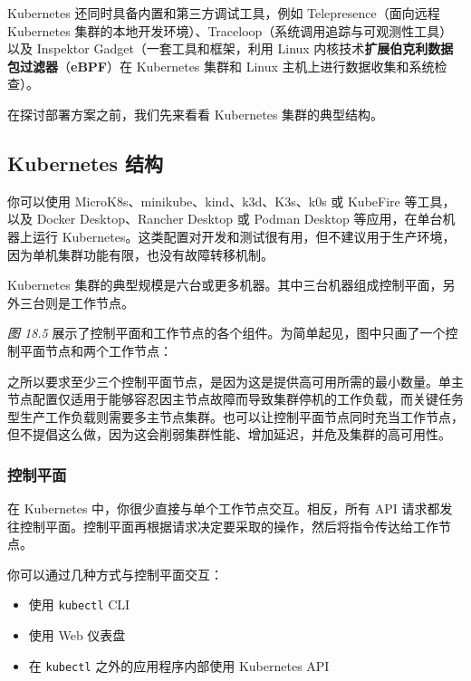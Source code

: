 \label{idx:1945}
Kubernetes 还同时具备内置和第三方调试工具，例如 Telepresence（面向远程 Kubernetes 集群的本地开发环境）、Traceloop（系统调用追踪与可观测性工具）以及 Inspektor Gadget（一套工具和框架，利用 Linux 内核技术\textbf{扩展伯克利数据包过滤器}（\textbf{eBPF}）在 Kubernetes 集群和 Linux 主机上进行数据收集和系统检查）。

\label{idx:1946}
在探讨部署方案之前，我们先来看看 Kubernetes 集群的典型结构。

\subsection{Kubernetes 结构}

\label{idx:1947}
你可以使用 MicroK8s、minikube、kind、k3d、K3s、k0s 或 KubeFire 等工具，以及 Docker Desktop、Rancher Desktop 或 Podman Desktop 等应用，在单台机器上运行 Kubernetes。这类配置对开发和测试很有用，但不建议用于生产环境，因为单机集群功能有限，也没有故障转移机制。

Kubernetes 集群的典型规模是六台或更多机器。其中三台机器组成控制平面，另外三台则是工作节点。

\emph{图 18.5} 展示了控制平面和工作节点的各个组件。为简单起见，图中只画了一个控制平面节点和两个工作节点：


\label{idx:1948}
之所以要求至少三个控制平面节点，是因为这是提供高可用所需的最小数量。单主节点配置仅适用于能够容忍因主节点故障而导致集群停机的工作负载，而关键任务型生产工作负载则需要多主节点集群。也可以让控制平面节点同时充当工作节点，但不提倡这么做，因为这会削弱集群性能、增加延迟，并危及集群的高可用性。

\subsubsection{控制平面}

\label{idx:1949}
在 Kubernetes 中，你很少直接与单个工作节点交互。相反，所有 API 请求都发往控制平面。控制平面再根据请求决定要采取的操作，然后将指令传达给工作节点。

你可以通过几种方式与控制平面交互：

\begin{itemize}
\item 使用 \texttt{kubectl} CLI
\item 使用 Web 仪表盘
\item 在 \texttt{kubectl} 之外的应用程序内部使用 Kubernetes API
\end{itemize}


